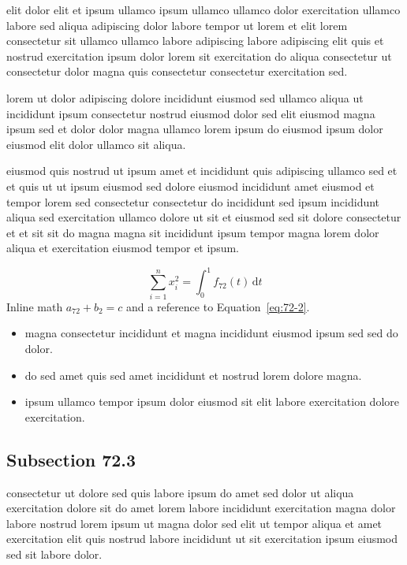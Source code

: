 \documentclass{article}
\begin{document}
elit dolor elit et ipsum ullamco ipsum ullamco ullamco dolor exercitation ullamco labore sed aliqua adipiscing dolor labore tempor ut lorem et elit lorem consectetur sit ullamco ullamco labore adipiscing labore adipiscing elit quis et nostrud exercitation ipsum dolor lorem sit exercitation do aliqua consectetur ut consectetur dolor magna quis consectetur consectetur exercitation sed.

lorem ut dolor adipiscing dolore incididunt eiusmod sed ullamco aliqua ut incididunt ipsum consectetur nostrud eiusmod dolor sed elit eiusmod magna ipsum sed et dolor dolor magna ullamco lorem ipsum do eiusmod ipsum dolor eiusmod elit dolor ullamco sit aliqua.

eiusmod quis nostrud ut ipsum amet et incididunt quis adipiscing ullamco sed et et quis ut ut ipsum eiusmod sed dolore eiusmod incididunt amet eiusmod et tempor lorem sed consectetur consectetur do incididunt sed ipsum incididunt aliqua sed exercitation ullamco dolore ut sit et eiusmod sed sit dolore consectetur et et sit sit do magna magna sit incididunt ipsum tempor magna lorem dolor aliqua et exercitation eiusmod tempor et ipsum.

\begin{equation}\label{eq:72-2}
  \sum_{i=1}^{n} x_i^{2} = \int_0^1 f_{72}(t)\,\mathrm{d}t
\end{equation}
Inline math $a_{72} + b_{2} = c$ and a reference to Equation~\eqref{eq:72-2}.

\begin{itemize}
  \item magna consectetur incididunt et magna incididunt eiusmod ipsum sed sed do dolor.
  \item do sed amet quis sed amet incididunt et nostrud lorem dolore magna.
  \item ipsum ullamco tempor ipsum dolor eiusmod sit elit labore exercitation dolore exercitation.
\end{itemize}

\subsection{Subsection 72.3}\label{sec:72-3}
consectetur ut dolore sed quis labore ipsum do amet sed dolor ut aliqua exercitation dolore sit do amet lorem labore incididunt exercitation magna dolor labore nostrud lorem ipsum ut magna dolor sed elit ut tempor aliqua et amet exercitation elit quis nostrud labore incididunt ut sit exercitation ipsum eiusmod sed sit labore dolor.
\end{document}
